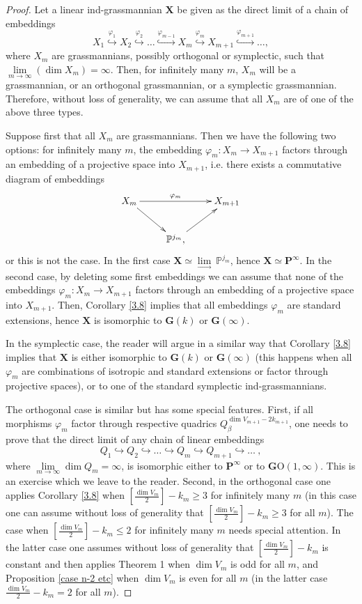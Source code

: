 \documentclass[12pt]{amsart}
\renewcommand{\phi}{\varphi}
\theoremstyle{definition}
\begin{document}
\begin{proof}
Let a linear ind-grassmannian $\mathbf{X}$ be given as the direct limit of a chain of embeddings
$$
X_1\stackrel{\phi_1}{\hookrightarrow}X_2\stackrel{\phi_2}{\hookrightarrow}
\dots\stackrel{\phi_{m-1}}{\hookrightarrow}X_m\stackrel{\phi_m}{\hookrightarrow}
X_{m+1}\stackrel{\phi_{m+1}}{\hookrightarrow}\dots,
$$
where $X_m$ are grassmannians, possibly orthogonal or symplectic, such that
$\underset{m\to\infty}\lim(\dim X_m)=\infty.$
Then, for infinitely many $m$, $X_m$ will be a grassmannian, or an orthogonal grassmannian, or a symplectic
grassmannian. Therefore, without loss of generality, we can assume that all $X_m$ are of one of the above three types.

Suppose first that all $X_m$ are grassmannians. Then we have the following two options: for infinitely many $m$,
the embedding $\phi_m:X_m\to X_{m+1}$ factors through an embedding of a projective space into $X_{m+1}$, i.e.
there exists a commutative diagram of embeddings
$$
\xymatrix{
X_m \ar[rr]^-{\phi_m}\ar[dr]& & X_{m+1}\\
& \mathbb{P}^{j_m},\ar[ur] & }
$$
or this is not the case. In the first case $\mathbf{X}\simeq\underset{\to}\lim~\mathbb{P}^{j_m}$, hence
$\mathbf{X}\simeq\mathbf{P}^{\infty}$.
In the second case, by deleting some first embeddings we can assume that none of the embeddings $\phi_m:X_m\to X_{m+1}$
factors through an embedding of a projective space into $X_{m+1}$. Then, Corollary \ref{3.8} implies that all embeddings
$\phi_m$ are standard extensions, hence $\mathbf{X}$ is isomorphic to $\mathbf{G}(k)$ or $\mathbf{G}(\infty)$.


In the symplectic case, the reader will argue in a similar way that Corollary \ref{3.8} implies that $\mathbf{X}$ is
either isomorphic to $\mathbf{G}(k)$ or $\mathbf{G}(\infty)$ (this happens when all $\phi_m$ are combinations of
isotropic and standard extensions or factor through projective spaces), or to one of the standard symplectic
ind-grassmannians.

The orthogonal case is similar but has some special features. First, if all morphisms $\phi_m$ factor through
respective quadrics $Q_{\beta}^{\dim V_{m+1}-2k_{m+1}}$, one needs to prove that the direct limit of any chain
of linear embeddings
$$
Q_1{\hookrightarrow}Q_2{\hookrightarrow}\dots{\hookrightarrow}Q_m{\hookrightarrow}Q_{m+1}{\hookrightarrow}\dots\ ,
$$
where $\underset{m\to\infty}\lim\dim Q_m=\infty$, is isomorphic either to $\mathbf{P}^{\infty}$ or to
$\mathbf{G}\mathrm{O}(1,\infty)$. This is an exercise which we leave to the reader. Second, in the orthogonal case one
applies Corollary \ref{3.8} when $[\frac{\dim V_m}{2}]-k_m\ge3$ for infinitely many $m$ (in this case one can assume
without loss of generality that $[\frac{\dim V_m}{2}]-k_m\ge3$ for all $m$). The case when
$[\frac{\dim V_m}{2}]-k_m\le2$ for infinitely many $m$ needs special attention. In the latter case one assumes without
loss of generality that $[\frac{\dim V_m}{2}]-k_m$ is constant and then applies Theorem 1 when $\dim V_m$ is odd for
all $m$, and Proposition \ref{case n-2 etc} when $\dim V_m$ is even for all $m$ (in the latter case
$\frac{\dim V_m}{2}-k_m=2$ for all $m$).


\end{proof}
\end{document}
